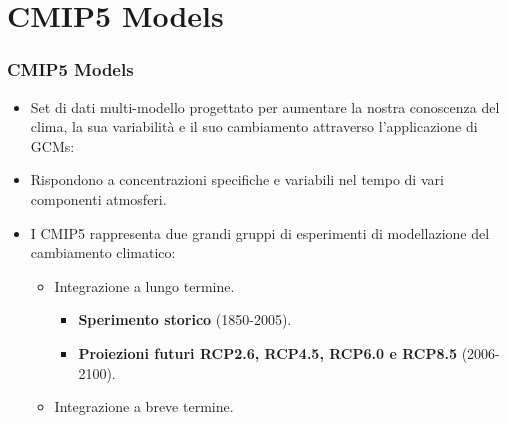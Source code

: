 \documentclass[14pt,usenames,dvipsnames]{beamer}
\begin{document}
\section{CMIP5 Models}

\begin{frame}
	\frametitle{CMIP5 Models}
{\fontsize{13pt}{14}\selectfont	
	\begin{itemize}
	\setlength\itemsep{10pt}
	 \item<2-> Set di dati multi-modello progettato per aumentare la nostra conoscenza del clima, la sua variabilità e il suo cambiamento attraverso l'applicazione di GCMs:
	  \item<3-> Rispondono a concentrazioni specifiche e variabili nel tempo di vari componenti atmosferi.
	 \item<4-> I CMIP5 rappresenta due grandi gruppi di esperimenti di modellazione del cambiamento climatico:
	   \begin{itemize}
	      \item<5-> {\fontsize{12pt}{14}\selectfont Integrazione a lungo termine.}
	       \begin{itemize}
	       \item \textbf{Sperimento storico} (1850-2005).
	       \item \textbf{Proiezioni futuri RCP2.6, RCP4.5, RCP6.0 e RCP8.5} (2006-2100).
	       \end{itemize}
	      \item<5-> {\fontsize{12pt}{14}\selectfont Integrazione a breve termine.}
	   \end{itemize}
		  
	\end{itemize}
	
}	
\end{frame}
\end{document}
